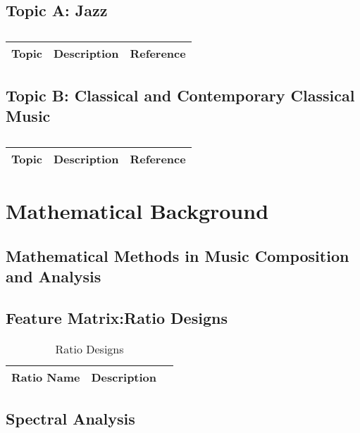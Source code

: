 \subsection{Topic A: Jazz}

\centering	
\begin{table}[H]\tiny
	\caption{}	
	\begin{tabular}{r|p{4cm}|l}
		\hline	
		Topic & Description & Reference \\
		\hline 
		\hline 
	\end{tabular}
\end{table}

\subsection{Topic B: Classical and Contemporary Classical Music}

\centering	
\begin{table}[H]\tiny
	\caption{}	
	\begin{tabular}{r|p{4cm}|l}
		\hline	
		Topic & Description & Reference \\
		\hline 
		\hline 
	\end{tabular}
\end{table}

\section{Mathematical Background}

\subsection{Mathematical Methods in Music Composition and Analysis}

\subsection{Feature Matrix:Ratio Designs}

\begin{table}[H]
	\caption{Ratio Designs}	
	\begin{tabular}{p{3cm}p{4cm}p{1cm}}
	\hline
	Ratio Name & Description & \\
	\hline 
	\end{tabular}
\end{table}

\subsection{Spectral Analysis}


